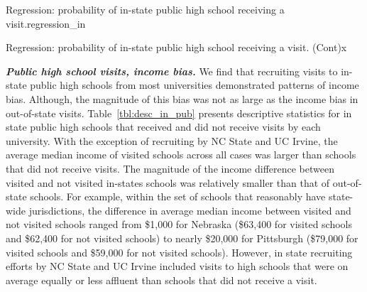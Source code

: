 \documentclass[twoside]{article}
\begin{document}
\begin{lscape-env}[8]{Regression: probability of in-state public high school receiving a visit.}{regression_in}
  
\end{lscape-env}

 \begin{lscape-env}[8]{Regression: probability of in-state public high school receiving a visit. (Cont)}{x}
  
\end{lscape-env}


\textbf{\textit{Public high school visits, income bias.}} We find that recruiting visits to in-state public high schools from most universities demonstrated patterns of income bias. Although, the magnitude of this bias was not as large as the income bias in out-of-state visits. Table~\ref{tbl:desc_in_pub} presents descriptive statistics for in state public high schools that received and did not receive visits by each university.  With the exception of recruiting by NC State and UC Irvine, the average median income of visited schools across all cases was larger than schools that did not receive visits. The magnitude of the income difference between visited and not visited in-states schools was relatively smaller than that of out-of-state schools. For example, within the set of schools that reasonably have state-wide jurisdictions, the difference in average median income between visited and not visited schools ranged from \$1,000 for Nebraska (\$63,400 for visited schools and \$62,400 for not visited schools) to nearly \$20,000 for Pittsburgh (\$79,000 for visited schools and \$59,000 for not visited schools). However, in state recruiting efforts by NC State and UC Irvine included visits to high schools that were on average equally or less affluent than schools that did not receive a visit.
\end{document}
